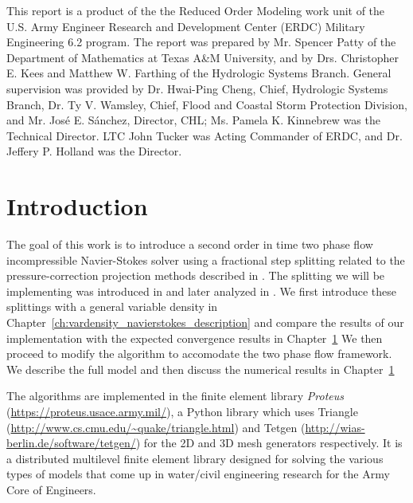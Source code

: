 \documentclass[letterpaper]{erdc}
\begin{document}
This report is a product of the the Reduced Order Modeling work unit of the
U.S. Army Engineer Research and Development Center (ERDC) Military Engineering
6.2 program.  The report was prepared by Mr. Spencer Patty of the Department of
Mathematics at Texas A\&M University, and by Drs. Christopher E. Kees and
Matthew W. Farthing of the Hydrologic Systems Branch.  General supervision was
provided by Dr. Hwai-Ping Cheng, Chief, Hydrologic Systems Branch, Dr. Ty
V. Wamsley, Chief, Flood and Coastal Storm Protection Division, and
Mr. Jos\'{e} E. S\'{a}nchez, Director, CHL; Ms. Pamela K. Kinnebrew was the
Technical Director.  LTC John Tucker was Acting Commander of ERDC, and
Dr. Jeffery P. Holland was the Director.

\mainmatter

\chapter{Introduction}

The goal of this work is to introduce a second order in time two phase flow incompressible Navier-Stokes solver using a fractional step splitting related to the pressure-correction projection methods described in \cite{guermond2006overview}.  The splitting we will be implementing was introduced in \cite{guermond2009splitting} and later analyzed in \cite{guermond2011error}.  We first introduce these splittings with a general variable density in Chapter~\ref{ch:vardensity_navierstokes_description} and compare the results of our implementation with the expected convergence results in Chapter~\ref{}  We then proceed to modify the algorithm to accomodate the two phase flow framework.  We describe the full model and then discuss the numerical results in Chapter~\ref{}

The algorithms are implemented in the finite element library \textit{Proteus} (\url{https://proteus.usace.army.mil/}), a Python library which uses Triangle (\url{http://www.cs.cmu.edu/~quake/triangle.html}) and Tetgen (\url{http://wias-berlin.de/software/tetgen/}) for the 2D and 3D mesh generators respectively.  It is a distributed multilevel finite element library designed for solving the various types of models that come up in water/civil engineering research for the Army Core of Engineers.






%
%
%
%
\end{document}
